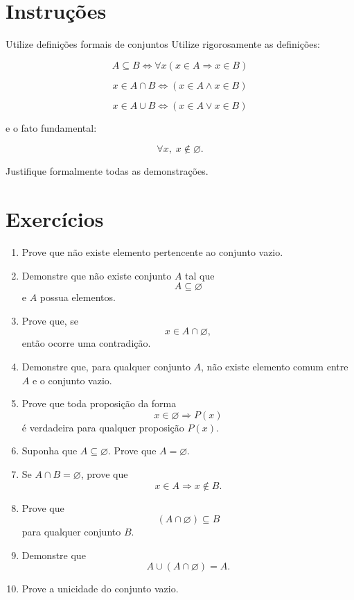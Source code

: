 \documentclass[12pt]{article}
\begin{document}
\vspace*{0.2cm}

\section*{Instruções}

\begin{block}{Utilize definições formais de conjuntos}
Utilize rigorosamente as definições:

\[
A \subseteq B \iff \forall x (x \in A \Rightarrow x \in B)
\]

\[
x \in A \cap B \iff (x \in A \land x \in B)
\]

\[
x \in A \cup B \iff (x \in A \lor x \in B)
\]

e o fato fundamental:

\[
\forall x,\; x \notin \varnothing.
\]
\end{block}

Justifique formalmente todas as demonstrações.

\section*{Exercícios}

\begin{enumerate}

\item Prove que não existe elemento pertencente ao conjunto vazio.

\item Demonstre que não existe conjunto $A$ tal que
\[
A \subseteq \varnothing
\]
e $A$ possua elementos.

\item Prove que, se
\[
x \in A \cap \varnothing,
\]
então ocorre uma contradição.

\item Demonstre que, para qualquer conjunto $A$,
não existe elemento comum entre $A$ e o conjunto vazio.

\item Prove que toda proposição da forma
\[
x \in \varnothing \Rightarrow P(x)
\]
é verdadeira para qualquer proposição $P(x)$.

\item Suponha que $A \subseteq \varnothing$. Prove que $A=\varnothing$.

\item Se $A \cap B=\varnothing$, prove que
\[
x \in A \Rightarrow x \notin B.
\]

\item Prove que
\[
(A \cap \varnothing)\subseteq B
\]
para qualquer conjunto $B$.

\item Demonstre que
\[
A \cup (A \cap \varnothing)=A.
\]

\item Prove a unicidade do conjunto vazio.

\end{enumerate}
\end{document}
